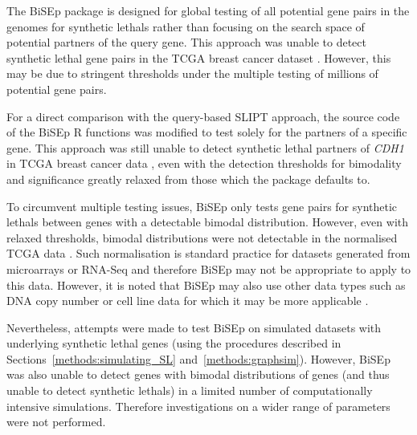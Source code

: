 The \gls{BiSEp} package is designed for global testing of all potential gene pairs in the \glspl{genome} for \glspl{synthetic lethal} rather than focusing on the search space of  potential partners of the query gene. This approach was unable to detect \gls{synthetic lethal} gene pairs in the \gls{TCGA} breast cancer  dataset \citep{TCGA2012}. However, this may be due to stringent thresholds under the multiple testing of millions of potential gene pairs.

For a direct comparison with the query-based \gls{SLIPT} approach, the source code of the \gls{BiSEp} R functions was modified to test solely for the partners of a specific gene. This approach was still unable to detect \gls{synthetic lethal} partners of \textit{CDH1} in \gls{TCGA} breast cancer  data \citep{TCGA2012}, even with the detection thresholds for bimodality and significance greatly relaxed from those which the package defaults to.

To circumvent multiple testing issues, \gls{BiSEp} only tests gene pairs for \glspl{synthetic lethal} between genes with a detectable bimodal distribution. However, even with relaxed thresholds, bimodal distributions were not detectable in the normalised \gls{TCGA} data \citep{TCGA2012}. Such normalisation \cite{limma} is standard practice for  datasets generated from \glspl{microarray} or \gls{RNA-Seq} and therefore \gls{BiSEp} may not be appropriate to apply to this data. However, it is noted that \gls{BiSEp} may also use other data types such as \acrshort{DNA} \gls{copy number} or cell line data for which it may be more applicable \citep{Wappett2016}.

Nevertheless, attempts were made to test \gls{BiSEp} on simulated datasets with underlying \gls{synthetic lethal} genes (using the procedures described in Sections~\ref{methods:simulating_SL} and~\ref{methods:graphsim}). However, \gls{BiSEp} was also unable to detect genes with bimodal distributions of genes (and thus unable to detect \glspl{synthetic lethal}) in a limited number of computationally intensive simulations. Therefore investigations on a wider range of parameters were not performed.


\iffalse

